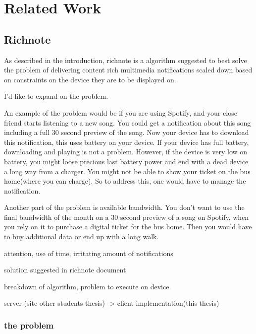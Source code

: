 
\chapter{Related Work} %
\label{Chapter2}

\section{Richnote} 
As described in the introduction, richnote\cite{Richnote} is a algorithm suggested to best solve the problem of delivering content rich multimedia notifications scaled down based on constraints on the device they are to be displayed on.

I'd like to expand on the problem.

An example of the problem would be if you are using Spotify, and your close friend starts listening to a new song. You could get a notification about this song including a full 30 second preview of the song. Now your device has to download this notification, this uses battery on your device. If your device has full battery, downloading and playing is not a problem. However, if the device is very low on battery, you might loose precious last battery power and end with a dead device a long way from a charger. You might not be able to show your ticket on the bus home(where you can charge). So to address this, one would have to manage the notification. 

Another part of the problem is available bandwidth. You don't want to use the final bandwidth of the month on a 30 second preview of a song on Spotify, when you rely on it to purchase a digital ticket for the bus home. Then you would have to buy additional data or end up with a long walk.

attention, use of time, irritating amount of notifications

solution suggested in richnote document

breakdown of algorithm, problem to execute on device.

server (site other students thesis) -> client implementation(this thesis)
\subsection{the problem}